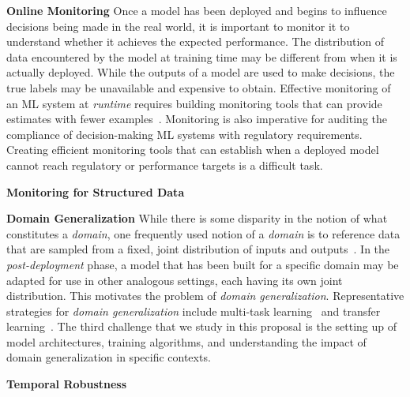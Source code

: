 \noindent \textbf{Online Monitoring}
Once a model has been deployed and begins to influence decisions being made in the real world, it is important to monitor it to understand whether it achieves the expected performance.
The distribution of data encountered by the model at training time may be different from when it is actually deployed. 
While the outputs of a model are used to make decisions, the true labels may be unavailable and expensive to obtain.
Effective monitoring of an ML system at \textit{runtime} requires building monitoring tools that can provide estimates with fewer examples~\citep{ginart2022mldemon}.
Monitoring is also imperative for auditing the compliance of decision-making ML systems with regulatory requirements.
Creating efficient monitoring tools that can establish when a deployed model cannot reach regulatory or performance targets is a difficult task.

\noindent \textbf{Monitoring for Structured Data}

\noindent \textbf{Domain Generalization}
While there is some disparity in the notion of what constitutes a \textit{domain}, one frequently used notion of a \textit{domain} is to reference data that are sampled from a fixed, joint distribution of inputs and outputs~\cite{wang2022generalizing}.
In the \textit{post-deployment} phase, a model that has been built for a specific domain may be adapted for use in other analogous settings, each having its own joint distribution.
This motivates the problem of \textit{domain generalization}. 
Representative strategies for \textit{domain generalization} include multi-task learning~\cite{caruana1997multitask} and transfer learning~\cite{zhuang2020comprehensive}.
The third challenge that we study in this proposal is the setting up of model architectures, training algorithms, and understanding the impact of domain generalization in specific contexts.

\noindent \textbf{Temporal Robustness}

